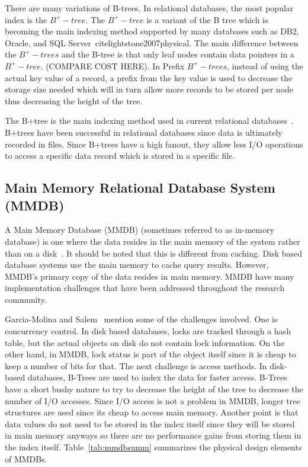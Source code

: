 \documentclass[12pt,a4paper]{article}
\begin{document}
There are many variations of B-trees. In relational databases, the most popular index is the $B^{+}-tree$. The $B^{+}-tree$ is a variant of the B  tree which is
becoming the main indexing method supported by many databases such as DB2, Oracle, and SQL Server~cite{lightstone2007physical}. The main difference between the
$B^{+}-trees$ and the B-tree is that only leaf nodes contain data pointers in a $B^{+}-tree$. (COMPARE COST HERE). In Prefix $B^{+}-trees$, instead of using the
actual key value of a record, a prefix from the key value is used to decrease the storage size needed which will in turn allow more records to be stored per
node thus decreasing the height of the tree.

The B+tree is the main indexing method used in current relational databases~\cite{lightstone2007physical}. B+trees have been successful in relational databases
since data is ultimately recorded in files. Since B+trees have a high fanout, they allow less I/O operations to access a specific data record which is stored in
a specific file.

\subsection{Main Memory Relational Database System (MMDB)}
\label{SEC-MMDB}

A Main Memory Database (MMDB) (sometimes referred to as in-memory database) is one where the data resides in the main memory of the system rather than on a
disk~\cite{garcia1992main}. It should be noted that this is different from caching. Disk based database systems use the main memory to cache query results.
However, MMDB's primary copy of the data resides in main memory. MMDB have many implementation challenges that have been addressed throughout the research
community.


Garcia-Molina and Salem~\cite{garcia1992main} mention some of the challenges involved. One is concurrency control. In disk based databases, locks are tracked
through a hash table, but the actual objects on disk do not contain lock information. On the other hand, in MMDB, lock status is part of the object itself since
it is cheap to keep a number of bits for that. The next challenge is access methods. In disk-based databases, B-Trees are used to index the data for faster
access. B-Trees have a short bushy nature to try to decrease the height of the tree to decrease the number of I/O accesses. Since I/O access is not a problem in
MMDB, longer tree structures are used since its cheap to access main memory. Another point is that data values do not need to be stored in the index itself
since they will be stored in main memory anyways so there are no performance gains from storing them in the index itself. Table~\ref{tab:mmdbsumm} summarizes
the physical design elements of MMDBs.
\end{document}
